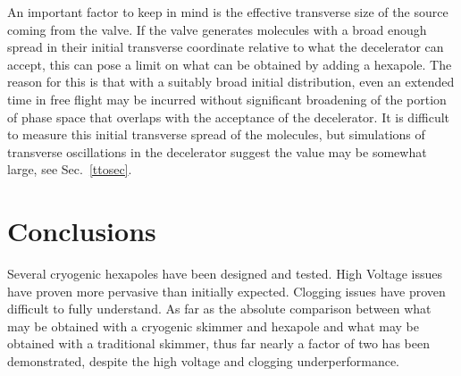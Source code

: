 An important factor to keep in mind is the effective transverse size of the source coming from the valve.
If the valve generates molecules with a broad enough spread in their initial transverse coordinate relative to what the decelerator can accept, this can pose a limit on what can be obtained by adding a hexapole.
The reason for this is that with a suitably broad initial distribution, even an extended time in free flight may be incurred without significant broadening of the portion of phase space that overlaps with the acceptance of the decelerator.
It is difficult to measure this initial transverse spread of the molecules, but simulations of transverse oscillations in the decelerator suggest the value may be somewhat large, see Sec.~\ref{ttosec}.

\section{Conclusions}

Several cryogenic hexapoles have been designed and tested.
High Voltage issues have proven more pervasive than initially expected.
Clogging issues have proven difficult to fully understand.
As far as the absolute comparison between what may be obtained with a cryogenic skimmer and hexapole and what may be obtained with a traditional skimmer, thus far nearly a factor of two has been demonstrated, despite the high voltage and clogging underperformance.












\ifx\justbeingincluded\undefined

\fi